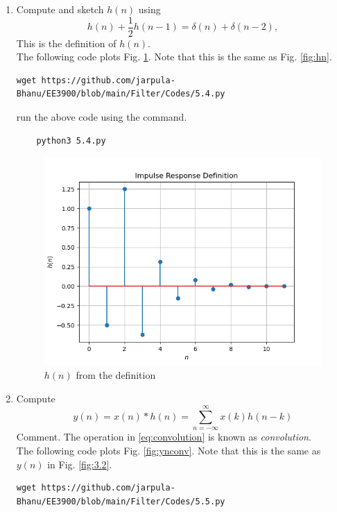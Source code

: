 \documentclass[journal,12pt,twocolumn]{IEEEtran}
\renewcommand\thesection{\arabic{section}}
\begin{document}
\begin{enumerate}[label=\thesection.\arabic*
,ref=\thesection.\theenumi]
\item Compute and sketch $h(n)$ using 
\begin{equation}
\label{eq:iir_filter_h}
h(n) + \frac{1}{2}h(n-1) = \delta(n) + \delta(n-2), 
\end{equation}
%
This is the definition of $h(n)$.
\\
\solution The following code plots Fig. \ref{fig:hndef}. Note that this is the same as Fig. 
\ref{fig:hn}. 
%
\begin{lstlisting}
wget https://github.com/jarpula-Bhanu/EE3900/blob/main/Filter/Codes/5.4.py
\end{lstlisting}
run the above code using the command.
\begin{lstlisting}
	python3 5.4.py
\end{lstlisting}
\begin{figure}[!ht]
\centering
\includegraphics[width=\columnwidth]{./figs/5.4.png}
\caption{$h(n)$ from the definition}
\label{fig:hndef}
\end{figure}
%
\item Compute 
%
\begin{equation}
\label{eq:convolution}
y(n) = x(n)*h(n) = \sum_{n=-\infty}^{\infty}x(k)h(n-k)
\end{equation}
%
Comment. The operation in \eqref{eq:convolution} is known as
{\em convolution}.
%
\\
\solution The following code plots Fig. \ref{fig:ynconv}. Note that this is the same as 
$y(n)$ in  Fig. 
\ref{fig:3.2}. 
%
\begin{lstlisting}
wget https://github.com/jarpula-Bhanu/EE3900/blob/main/Filter/Codes/5.5.py

\end{lstlisting}
\end{enumerate}
\end{document}
